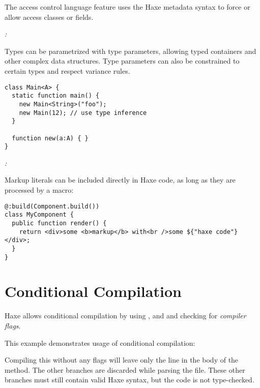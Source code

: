 The access control language feature uses the Haxe metadata syntax to force or allow access classes or fields.

\emph{:}

Types can be parametrized with type parameters, allowing typed containers and other complex data structures. Type parameters can also be constrained to certain types and respect variance rules.

\begin{lstlisting}
class Main<A> {
  static function main() {
    new Main<String>("foo");
    new Main(12); // use type inference
  }

  function new(a:A) { }
}
\end{lstlisting}

\emph{:}

Markup literals can be included directly in Haxe code, as long as they are processed by a macro:

\begin{lstlisting}
@:build(Component.build())
class MyComponent {
  public function render() {
    return <div>some <b>markup</b> with<br />some ${"haxe code"}</div>;
  }
}
\end{lstlisting}

\section{Conditional Compilation}
\label{lf-condition-compilation}

Haxe allows conditional compilation by using ,  and  and checking for \emph{compiler flags}.


This example demonstrates usage of conditional compilation:


Compiling this without any flags will leave only the  line in the body of the  method. The other branches are discarded while parsing the file. These other branches must still contain valid Haxe syntax, but the code is not type-checked.

